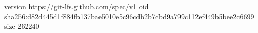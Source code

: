 version https://git-lfs.github.com/spec/v1
oid sha256:d82d445d1f884fb137bae5010e5c96cdb2b7cbd9a799c112ef449b5bee2c6699
size 262240
